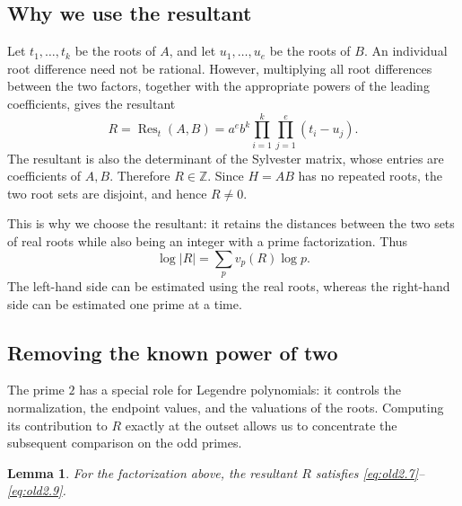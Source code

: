 \documentclass[11pt,a4paper]{article}
\numberwithin{equation}{section}
\newtheorem{lemma}[theorem]{Lemma}
\theoremstyle{definition}
\begin{document}
\subsection{Why we use the resultant}

Let \(t_1,\ldots,t_k\) be the roots of \(A\), and let \(u_1,\ldots,u_e\) be the roots of \(B\). An individual root difference need not be rational. However, multiplying all root differences between the two factors, together with the appropriate powers of the leading coefficients, gives the resultant
\begin{equation}\label{eq:resultant_product}
R=\operatorname{Res}_t(A,B)
  =a^e b^k\prod_{i=1}^k\prod_{j=1}^e(t_i-u_j).
\end{equation}
The resultant is also the determinant of the Sylvester matrix, whose entries are coefficients of \(A,B\). Therefore \(R\in\mathbb Z\). Since \(H=AB\) has no repeated roots, the two root sets are disjoint, and hence \(R\ne0\).

This is why we choose the resultant: it retains the distances between the two sets of real roots while also being an integer with a prime factorization. Thus
\[
\log|R|=\sum_p v_p(R)\log p.
\]
The left-hand side can be estimated using the real roots, whereas the right-hand side can be estimated one prime at a time.

\subsection{Removing the known power of two}

The prime \(2\) has a special role for Legendre polynomials: it controls the normalization, the endpoint values, and the valuations of the roots. Computing its contribution to \(R\) exactly at the outset allows us to concentrate the subsequent comparison on the odd primes.

\begin{lemma}\label{lem:two}
For the factorization above, the resultant \(R\) satisfies \eqref{eq:old2.7}--\eqref{eq:old2.9}.
\end{lemma}
\end{document}
